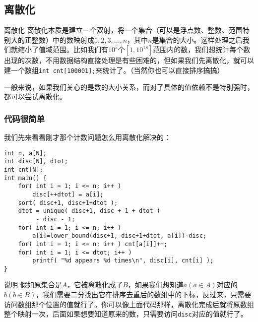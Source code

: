 \documentclass{beamer}
\begin{document}
		\subsection{离散化}
		\begin{frame}{离散化}
			离散化本质是建立一个双射，将一个集合（可以是浮点数、整数、范围特别大的正整数）中的数映射成${1,2,3,\dots,n}$，其中$n$是集合的大小。这样处理之后我们就缩小了值域范围。比如我们有$10^5$个$[1,10^{18}]$范围内的数，我们想统计每个数出现的次数，不用数据结构直接处理是有些困难的，但如果我们先离散化，就可以建一个数组\texttt{int cnt[100001];}来统计了。（当然你也可以直接排序搞搞）	
			
			一般来说，如果我们关心的是数的大小关系，而对了具体的值依赖不是特别强时，都可以尝试离散化。
		\end{frame}
		\begin{frame}[fragile=singleslide]
			\frametitle{代码很简单}	
			我们先来看看刚才那个计数问题怎么用离散化解决的：
			\begin{verbatim}
int n, a[N];
int disc[N], dtot;
int cnt[N];
int main() {
    for( int i = 1; i <= n; i++ ) 
        disc[++dtot] = a[i];
    sort( disc+1, disc+1+dtot );
    dtot = unique( disc+1, disc + 1 + dtot ) 
         - disc - 1;
    for( int i = 1; i <= n; i++ ) 
        a[i]=lower_bound(disc+1, disc+1+dtot, a[i])-disc;
    for( int i = 1; i <= n; i++ ) cnt[a[i]]++;
    for( int i = 1; i <= dtot; i++ )
        printf( "%d appears %d times\n", disc[i], cnt[i] );
}
			\end{verbatim}
		\end{frame} 
		\begin{frame}{说明}
			假如原集合是$A$，它被离散化成了$B$，如果我们想知道$a (a \in A)$对应的$b(b \in B)$，我们需要二分找出它在排序去重后的数组中的下标，反过来，只需要访问数组那个位置的值就行了。你可以像上面代码那样，离散化完成后就将原数组整个映射一次，后面如果想要知道原来的数，只需要访问\texttt{disc}对应的值就行了。
		\end{frame}
\end{document}
